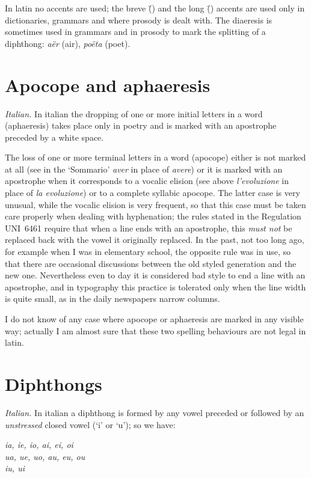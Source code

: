 \documentclass{ltugboat}
\begin{document}
 In latin no accents are used; the breve (\u{}) and the
long (\={}) accents are  used  only  in  dictionaries,  grammars  and  where
prosody  is  dealt  with. The diaeresis is sometimes used in grammars and in
prosody to mark the splitting  of  a  diphthong:  {\it  a\"er}  (air),  {\it
po\"eta} (poet).

\section{Apocope and aphaeresis}
{\it  Italian.}  In italian the dropping of one or more initial letters in a
word (aphaeresis)  takes  place  only  in  poetry  and  is  marked  with  an
apostrophe preceded by a white space.

The  loss  of one or more terminal letters in a word (apocope) either is not
marked at all (see in the `Sommario' {\it aver} in place of  {\it  avere\/})
or  it is marked with an apostrophe when it corresponds to a vocalic elision
(see above {\it l'evoluzione} in place of {\it la  evoluzione\/})  or  to  a
complete  syllabic  apocope.  The  latter  case  is  very unusual, while the
vocalic elision is very frequent, so that  this  case  must  be  taken  care
properly  when  dealing with hyphenation; the rules stated in the Regulation
UNI~6461 \cite{6461} require that when a line ends with an apostrophe,  this
{\it  must  not}  be replaced back with the vowel it originally replaced. In
the past, not too long ago, for example when I was in elementary school, the
opposite  rule  was in use, so that there are occasional discussions between
the old styled generation and the new one. Nevertheless even to  day  it  is
considered  bad  style  to  end a line with an apostrophe, and in typography
this practice is tolerated only when the line width is quite  small,  as  in
the daily newspapers narrow columns.

 I do not know of any case where apocope or aphaeresis
are marked in any visible way; actually I am  almost  sure  that  these  two
spelling behaviours are not legal in latin.

\section{Diphthongs}
{\it  Italian.}  In  italian  a diphthong is formed by any vowel preceded or
followed by an {\it unstressed} closed vowel (`i' or `u'); so we have:
 \begin{center}
\it  ia, ie, io,  ai, ei, oi  \\
     ua, ue, uo,  au, eu, ou  \\
             iu,  ui
\end{center}
\end{document}
